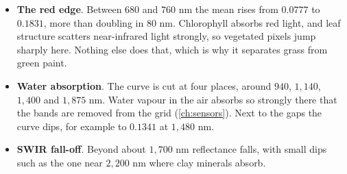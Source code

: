 \begin{itemize}
\item \textbf{The red edge}. Between $680$ and $760$ nm the mean rises from
$0.0777$ to $0.1831$\tagC, more than doubling in $80$ nm. Chlorophyll absorbs red light, and leaf
structure scatters near-infrared light strongly, so vegetated pixels jump sharply here. Nothing
else does that, which is why it separates grass from green paint.
\item \textbf{Water absorption}. The curve is cut at four places, around $940$, $1{,}140$,
$1{,}400$ and $1{,}875$ nm. Water vapour in the air absorbs so strongly there that the bands are
removed from the grid (\cref{ch:sensors}). Next to the gaps the curve dips, for example to
$0.1341$ at $1{,}480$ nm\tagC.
\item \textbf{SWIR fall-off}. Beyond about $1{,}700$ nm reflectance falls, with small dips such as
the one near $2{,}200$ nm where clay minerals absorb.
\end{itemize}

